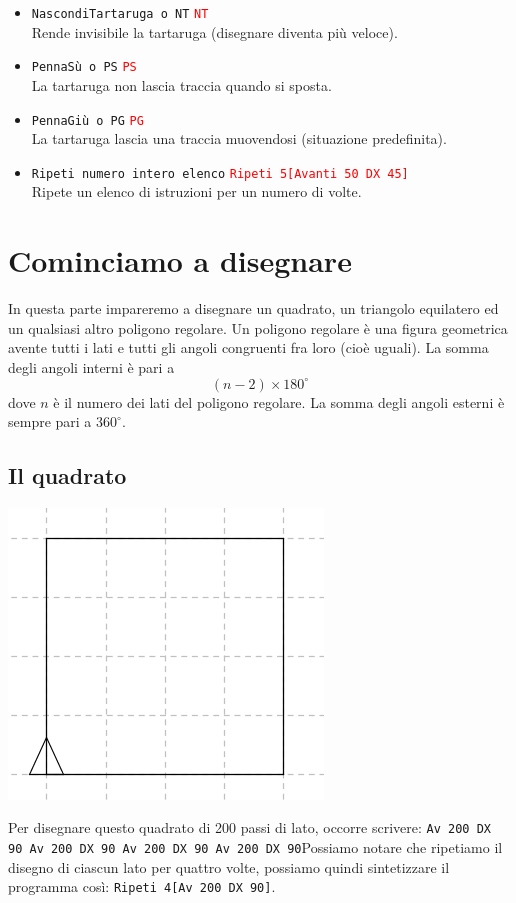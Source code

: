 \begin{itemize}
	\item \texttt{NascondiTartaruga o NT}\hspace {4cm } \textcolor{red}{ \texttt{NT}}\\
	Rende invisibile la tartaruga (disegnare diventa più veloce).

	\item \texttt{PennaSù o PS}\hspace {4cm } \textcolor{red}{ \texttt{PS}}\\
	La tartaruga non lascia traccia quando si sposta.

	\item \texttt{PennaGiù o PG}\hspace {4cm } \textcolor{red}{ \texttt{PG}}\\
	La tartaruga lascia una traccia muovendosi (situazione predefinita).

	\item \texttt{Ripeti numero intero elenco}\hspace {4cm } \textcolor{red}{ \texttt{Ripeti 5[Avanti 50 DX 45]}}\\
	Ripete un elenco di istruzioni per un numero di volte.
\end{itemize}


\section{Cominciamo a disegnare}
In questa parte impareremo a disegnare un quadrato, un triangolo equilatero ed un qualsiasi altro poligono regolare\textellipsis. Un poligono regolare è una figura geometrica avente tutti i lati e tutti gli angoli congruenti fra loro (cioè uguali). La somma degli angoli interni è pari a $$(n-2) \times 180^{\circ}$$ dove $n$ è il numero dei lati del poligono regolare. La somma degli angoli esterni è sempre pari a $360^{\circ}$.

\subsection{Il quadrato}
\begin{center}
	\includegraphics{pics/bases-carre.png}
\end{center}
\noindent Per disegnare questo quadrato di 200 passi di lato, occorre scrivere:
\lstinline!Av 200 DX 90 Av 200 DX 90 Av 200 DX 90 Av 200 DX 90!Possiamo notare che ripetiamo il disegno di ciascun lato per quattro volte, possiamo quindi sintetizzare il programma così: \lstinline!Ripeti 4[Av 200 DX 90]!.


